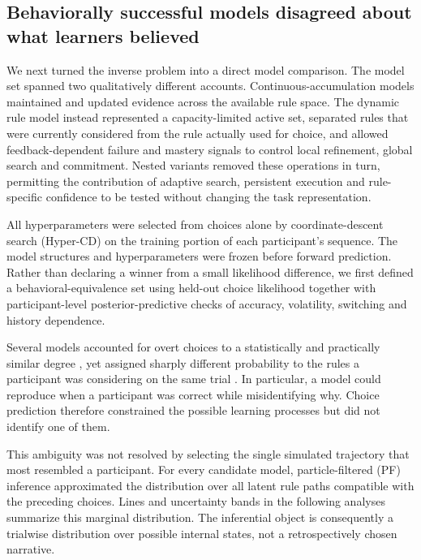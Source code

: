\subsection{Behaviorally successful models disagreed about what learners believed}

We next turned the inverse problem into a direct model comparison. The model
set spanned two qualitatively different accounts. Continuous-accumulation
models maintained and updated evidence across the available rule space. The
dynamic rule model instead represented a capacity-limited active set, separated
rules that were currently considered from the rule actually used for choice,
and allowed feedback-dependent failure and mastery signals to control local
refinement, global search and commitment. Nested variants removed these
operations in turn, permitting the contribution of adaptive search, persistent
execution and rule-specific confidence to be tested without changing the task
representation.

All hyperparameters were selected from choices alone by coordinate-descent
search (Hyper-CD) on the training portion of each participant's sequence. The
model structures and hyperparameters were frozen before forward prediction.
Rather than declaring a winner from a small likelihood difference, we first
defined a behavioral-equivalence set using held-out choice likelihood together
with participant-level posterior-predictive checks of accuracy, volatility,
switching and history dependence.

Several models accounted for overt choices to a statistically and practically
similar degree , yet assigned sharply different probability
to the rules a participant was considering on the same trial
.
In particular, a model could reproduce when a participant was correct while
misidentifying why. Choice prediction therefore constrained the possible
learning processes but did not identify one of them.

This ambiguity was not resolved by selecting the single simulated trajectory
that most resembled a participant. For every candidate model, particle-filtered
(PF) inference approximated the distribution over all latent rule paths
compatible with the preceding choices. Lines and uncertainty bands in the
following analyses summarize this marginal distribution. The inferential object
is consequently a trialwise distribution over possible internal states, not a
retrospectively chosen narrative.

